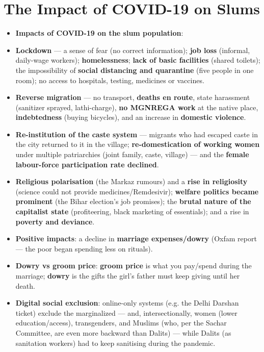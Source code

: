 \section{The Impact of COVID-19 on Slums}

\begin{KeyConcept}
\begin{itemize}
\item \textbf{Impacts of COVID-19 on the slum population}:
\item \textbf{Lockdown} --- a sense of fear (no correct information); \textbf{job loss} (informal, daily-wage workers); \textbf{homelessness}; \textbf{lack of basic facilities} (shared toilets); the impossibility of \textbf{social distancing and quarantine} (five people in one room); no access to hospitals, testing, medicines or vaccines.
\item \textbf{Reverse migration} --- no transport, \textbf{deaths en route}, state harassment (sanitizer sprayed, lathi-charge), \textbf{no MGNREGA work} at the native place, \textbf{indebtedness} (buying bicycles), and an increase in \textbf{domestic violence}.
\item \textbf{Re-institution of the caste system} --- migrants who had escaped caste in the city returned to it in the village; \textbf{re-domestication of working women} under multiple patriarchies (joint family, caste, village) --- and the \textbf{female labour-force participation rate declined}.
\item \textbf{Religious polarisation} (the Markaz rumours) and a \textbf{rise in religiosity} (science could not provide medicines/Remdesivir); \textbf{welfare politics became prominent} (the Bihar election's job promises); the \textbf{brutal nature of the capitalist state} (profiteering, black marketing of essentials); and a rise in \textbf{poverty and deviance}.
\item \textbf{Positive impacts}: a decline in \textbf{marriage expenses/dowry} (Oxfam report --- the poor began spending less on rituals).
\item \textbf{Dowry vs groom price}: \textbf{groom price} is what you pay/spend during the marriage; \textbf{dowry} is the gifts the girl's father must keep giving until her death.
\item \textbf{Digital social exclusion}: online-only systems (e.g. the Delhi Darshan ticket) exclude the marginalized --- and, intersectionally, women (lower education/access), transgenders, and Muslims (who, per the Sachar Committee, are even more backward than Dalits) --- while Dalits (as sanitation workers) had to keep sanitising during the pandemic.
\end{itemize}
\end{KeyConcept}


